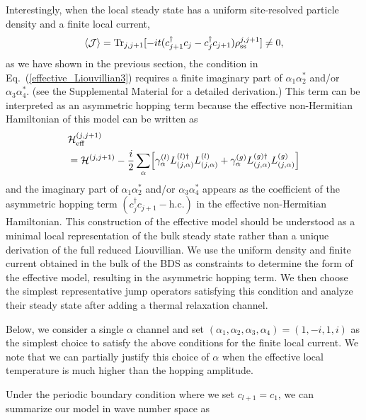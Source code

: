 \documentclass[a4paper, amsfonts, amssymb, amsmath, reprint, showkeys, nofootinbib, twoside,superscriptaddress, prb]{revtex4-2}
\newcommand{\m}[1]{\mathcal{#1}}
\newcommand{\mr}[1]{\mathrm{#1}}
\begin{document}
Interestingly, when the local steady state has a uniform site-resolved particle density and a finite local current,
\begin{align}
\ev{\m{J}} = \mr{Tr}_{j, j+1}[-it(c^\dagger_{j+1}c_j-c^\dagger_j c_{j+1})\rho^{j, j+1}_{\mr{ss}}]\neq 0,\label{local_current}
\end{align}
as we have shown in the previous section, the condition in Eq.~(\ref{effective_Liouvillian3}) requires a finite imaginary part of $\alpha_1\alpha_2^*$ and/or $\alpha_3\alpha_4^*$. (see the Supplemental Material for a detailed derivation.\cite{Supple})
This term can be interpreted as an asymmetric hopping term because the effective non-Hermitian Hamiltonian of this model can be written as
\begin{align}
    &\m{H}^{(j,j+1)}_{\mr{eff}}\nonumber\\
    &= \m{H}^{(j,j+1)} -\frac{i}{2} \sum_{\alpha} \Bigl[\gamma^{(l)}_{\alpha} L^{(l)\dagger}_{(j,\alpha)} L^{(l)}_{(j,\alpha)} + \gamma^{(g)}_{\alpha} L^{(g)\dagger}_{(j,\alpha)} L^{(g)}_{(j,\alpha)}\Bigr]\nonumber
\end{align}
and the imaginary part of $\alpha_1\alpha_2^*$ and/or $\alpha_3\alpha_4^*$ appears as the coefficient of the asymmetric hopping term $(c^\dagger_j c_{j+1} - \mr{h.c.})$ in the effective non-Hermitian Hamiltonian.
This construction of the  effective model should be understood as a minimal local representation of the bulk steady state rather than a unique derivation of the full reduced Liouvillian. 
We use the uniform density and finite current obtained in the bulk of the BDS as constraints to determine the form of the effective model, resulting in the asymmetric hopping term. We then choose the simplest representative jump operators satisfying this condition and analyze their steady state after adding a thermal relaxation channel.
 
Below, we consider a single $\alpha$ channel and set $(\alpha_1, \alpha_2, \alpha_3, \alpha_4) = (1, -i, 1, i)$ as the simplest choice to satisfy the above conditions for the finite local current. We note that we can partially justify this choice of $\alpha$ when the effective local temperature is much higher than the hopping amplitude.\cite{Supple} 

Under the periodic boundary condition where we set $c_{l+1} = c_1$, we can summarize our model in wave number space as
\end{document}
